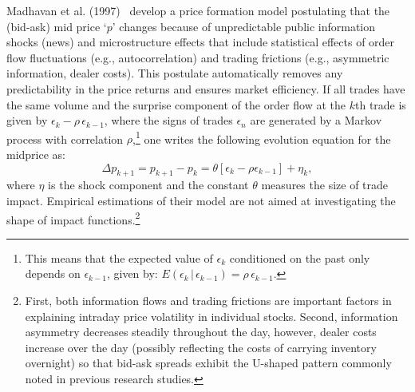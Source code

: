 Madhavan et al. (1997)~\cite{madhaven1997} develop a price formation model postulating that the (bid-ask) mid price `$p$' changes because of unpredictable public information shocks (news) and microstructure effects that include statistical effects of order flow fluctuations (e.g., autocorrelation) and trading frictions (e.g., asymmetric information, dealer costs). This postulate automatically removes any predictability in the price returns and ensures market efficiency. If all trades have the same volume and the surprise component of the order flow at the $k$th trade is given by $\epsilon_k - \rho \,\epsilon_{k-1}$, where the signs of trades $\epsilon_n$ are generated by a Markov process with correlation $\rho$,\footnote{This means that the expected value of $\epsilon_k$ conditioned on the past only depends on $\epsilon_{k-1}$, given by: $E(\epsilon_k\,|\,\epsilon_{k-1})=\rho\,\epsilon_{k-1}$.}  one writes the following evolution equation for the midprice as:
	\begin{equation} \label{eqn:midpointdelta}
	\Delta p_{k+1}= p_{k+1} - p_k= \theta[ \epsilon_k - \rho \epsilon_{k-1}] + \eta_k,
	\end{equation}
where $\eta$ is the shock component and the constant $\theta$ measures the size of trade impact. Empirical estimations of their model are not aimed at investigating the shape of impact functions.\footnote{First, both information flows and trading frictions are important factors in explaining intraday price volatility in individual stocks. Second, information asymmetry decreases steadily throughout the day, however, dealer costs increase over the day (possibly reflecting the costs of carrying inventory overnight) so that bid-ask spreads exhibit the U-shaped pattern commonly noted in previous research studies.}


